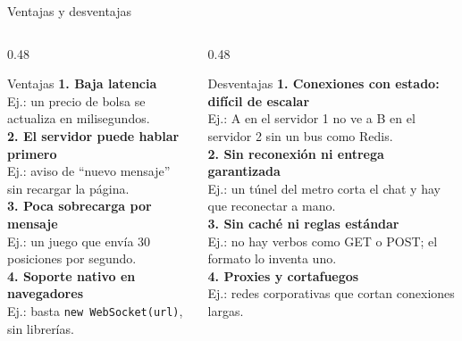 \documentclass[aspectratio=169,11pt]{beamer}
\newcommand{\bloqueactual}{0}
\newcommand{\quienhabla}{}
\newcommand{\seccion}[2]{\gdef\bloqueactual{#1}\gdef\quienhabla{#2}}
\begin{document}
\seccion{4}{Juan Pablo}
\begin{frame}{Ventajas y desventajas}
  \begin{columns}[T]
    \begin{column}{0.48\textwidth}
      \begin{exampleblock}{Ventajas}
        \small
        \textbf{1. Baja latencia}\\
        {\footnotesize\color{gris}Ej.: un precio de bolsa se actualiza en milisegundos.}\\[2pt]
        \textbf{2. El servidor puede hablar primero}\\
        {\footnotesize\color{gris}Ej.: aviso de “nuevo mensaje” sin recargar la página.}\\[2pt]
        \textbf{3. Poca sobrecarga por mensaje}\\
        {\footnotesize\color{gris}Ej.: un juego que envía 30 posiciones por segundo.}\\[2pt]
        \textbf{4. Soporte nativo en navegadores}\\
        {\footnotesize\color{gris}Ej.: basta \texttt{new WebSocket(url)}, sin librerías.}
      \end{exampleblock}
    \end{column}
    \begin{column}{0.48\textwidth}
      \begin{alertblock}{Desventajas}
        \small
        \textbf{1. Conexiones con estado: difícil de escalar}\\
        {\footnotesize\color{gris}Ej.: A en el servidor 1 no ve a B en el servidor 2 sin un bus como Redis.}\\[2pt]
        \textbf{2. Sin reconexión ni entrega garantizada}\\
        {\footnotesize\color{gris}Ej.: un túnel del metro corta el chat y hay que reconectar a mano.}\\[2pt]
        \textbf{3. Sin caché ni reglas estándar}\\
        {\footnotesize\color{gris}Ej.: no hay verbos como GET o POST; el formato lo inventa uno.}\\[2pt]
        \textbf{4. Proxies y cortafuegos}\\
        {\footnotesize\color{gris}Ej.: redes corporativas que cortan conexiones largas.}
      \end{alertblock}
    \end{column}
  \end{columns}
\end{frame}
\end{document}

